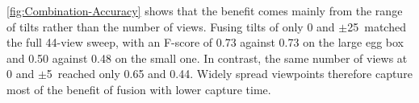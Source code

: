 \autoref{fig:Combination-Accuracy} shows that the benefit comes mainly from the range of tilts rather than the number of views. Fusing tilts of only 0 and $\pm$25\degree\ matched the full 44-view sweep, with an F-score of 0.73 against 0.73 on the large egg box and 0.50 against 0.48 on the small one. In contrast, the same number of views at 0 and $\pm$5\degree\ reached only 0.65 and 0.44. Widely spread viewpoints therefore capture most of the benefit of fusion with lower capture time.





